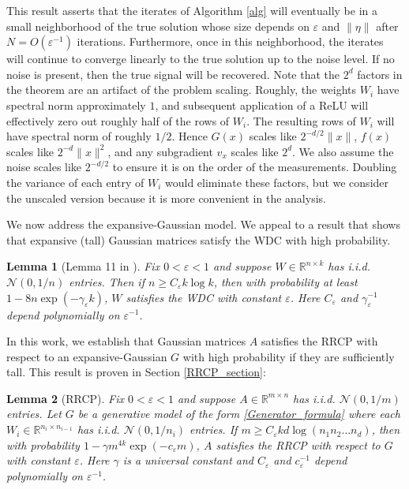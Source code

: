\documentclass[11pt]{article}
\renewcommand{\epsilon}{\varepsilon}
\newcommand{\R}{\mathbb{R}}
\newcommand{\G}{G}
\newtheorem{lem}{Lemma}
\theoremstyle{remark}
\begin{document}
This result asserts that the iterates of Algorithm \ref{alg} will eventually be in a small neighborhood of the true solution whose size depends on $\epsilon$ and $\|\eta\|$ after $N = O(\epsilon^{-1})$ iterations. Furthermore, once in this neighborhood, the iterates will continue to converge linearly to the true solution up to the noise level. If no noise is present, then the true signal will be recovered. Note that the $2^d$ factors in the theorem are an artifact of the problem scaling. Roughly, the weights $W_i$ have spectral norm approximately $1$, and subsequent application of a ReLU will effectively zero out roughly half of the rows of $W_i$.  The resulting rows of $W_i$ will have spectral norm of roughly $1/2$.   Hence $\G(x)$ scales like $2^{-d/2}\|x\|$, $f(x)$ scales like $2^{-d}\|x\|^2$, and any subgradient $v_x$ scales like $2^d$. We also assume the noise scales like $2^{-d/2}$ to ensure it is on the order of the measurements. Doubling the variance of each entry of $W_i$ would eliminate these factors, but we consider the unscaled version because it is more convenient in the analysis.

We now address the expansive-Gaussian model.  We appeal to a result that shows that expansive (tall) Gaussian matrices satisfy the WDC with high probability.  
 \begin{lem}[Lemma 11 in  \cite{HV2017}] \label{WDC_lemma}
Fix $0 < \epsilon < 1$ and suppose $W \in \R^{n \times k}$ has i.i.d. $\mathcal{N}(0,1/n)$ entries. Then if $n \geqslant C_{\epsilon} k \log k$, then with probability at least $1 - 8n \exp(-\gamma_{\epsilon} k)$, $W$ satisfies the WDC with constant $\epsilon$. Here $C_{\epsilon}$ and $\gamma_{\epsilon}^{-1}$ depend polynomially on $\epsilon^{-1}$.
\end{lem}

 In this work, we establish that Gaussian matrices $A$ satisfies the RRCP with respect to an expansive-Gaussian $\G$ with high probability if they are sufficiently tall. This result is proven in Section \ref{RRCP_section}: \begin{lem}[RRCP] \label{RRCP_lemma}
Fix $0 < \epsilon < 1$ and suppose $A \in \R^{m \times n}$ has i.i.d. $\mathcal{N}(0,1/m)$ entries. Let $\G$ be a generative model of the form \eqref{Generator_formula} where each $W_i \in \R^{n_i \times n_{i-1}}$ has i.i.d. $\mathcal{N}(0,1/n_i)$ entries. If $m \geqslant C_{\epsilon} kd \log(n_1n_2\dots n_d)$, then with probability $1-\gamma m^{4k}\exp(-c_{\epsilon}m)$, $A$ satisfies the RRCP with respect to $\G$ with constant $\epsilon$. Here $\gamma$ is a universal constant and $C_{\epsilon}$ and $c_{\epsilon}^{-1}$ depend polynomially on $\epsilon^{-1}$. 
\end{lem}
\end{document}
